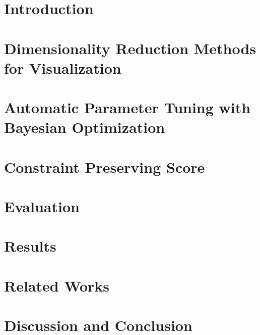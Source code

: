 \section{Introduction}


\section{Dimensionality Reduction Methods for Visualization}


\section{Automatic Parameter Tuning with Bayesian Optimization}


\section{Constraint Preserving Score}


\section{Evaluation}


\section{Results}


\section{Related Works}


\section{Discussion and Conclusion}
